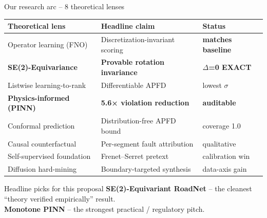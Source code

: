\documentclass[aspectratio=169,10pt]{beamer}
\begin{document}
\begin{frame}{Our research arc -- 8 theoretical lenses}
\centering\scriptsize
\begin{tabular}{l l l}
  \toprule
  \textbf{Theoretical lens} & \textbf{Headline claim} & \textbf{Status} \\
  \midrule
  Operator learning (FNO) & Discretization-invariant scoring & \cellcolor{success!15}\textbf{matches baseline} \\
  \rowcolor{accent!15}
  \textbf{SE(2)-Equivariance} & \textbf{Provable rotation invariance} & \cellcolor{accent!25}\textbf{$\Delta$=0 EXACT} \\
  Listwise learning-to-rank & Differentiable APFD & lowest $\sigma$ \\
  \rowcolor{accent!10}
  \textbf{Physics-informed (PINN)} & \textbf{5.6× violation reduction} & \cellcolor{accent!20}\textbf{auditable} \\
  Conformal prediction & Distribution-free APFD bound & coverage 1.0 \\
  Causal counterfactual & Per-segment fault attribution & qualitative \\
  Self-supervised foundation & Frenet--Serret pretext & calibration win \\
  Diffusion hard-mining & Boundary-targeted synthesis & data-axis gain \\
  \bottomrule
\end{tabular}

\vspace{0.7em}
\begin{exampleblock}{Headline picks for this proposal}
\footnotesize
\textbf{SE(2)-Equivariant RoadNet} -- the cleanest ``theory verified empirically'' result.\\
\textbf{Monotone PINN} -- the strongest practical / regulatory pitch.
\end{exampleblock}
\end{frame}
\end{document}
